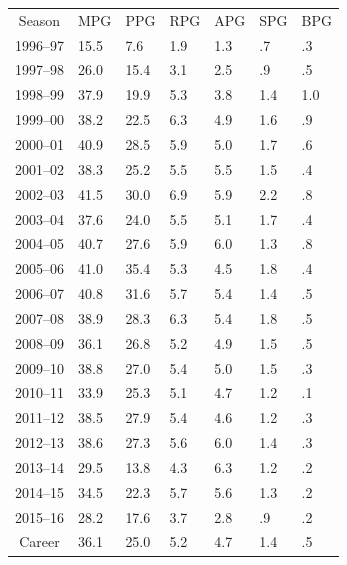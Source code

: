 	
	\begin{table}
		\centering
		\begin{tabularx}{0.9\textwidth}{| c | X | X | X | X | X | X |}
			
			Season  & MPG  & PPG  &	RPG & APG &	SPG & BPG \\
			1996–97 & 15.5 & 7.6  & 1.9 & 1.3 &  .7	&  .3 \\
			1997–98	& 26.0 & 15.4 &	3.1	& 2.5 &	 .9	&  .5 \\
			1998–99	& 37.9 & 19.9 &	5.3 & 3.8 &	1.4	& 1.0 \\
			1999–00	& 38.2 & 22.5 &	6.3	& 4.9 &	1.6	&  .9 \\
			2000–01 & 40.9 & 28.5 &	5.9	& 5.0 &	1.7 &  .6 \\
			2001–02 & 38.3 & 25.2 &	5.5	& 5.5 &	1.5	&  .4 \\
			2002–03 & 41.5 & 30.0 &	6.9	& 5.9 &	2.2	&  .8 \\
			2003–04	& 37.6 & 24.0 &	5.5	& 5.1 &	1.7	&  .4 \\
			2004–05	& 40.7 & 27.6 &	5.9	& 6.0 &	1.3 &  .8 \\
			2005–06	& 41.0 & 35.4 &	5.3	& 4.5 &	1.8 &  .4 \\
			2006–07	& 40.8 & 31.6 &	5.7	& 5.4 &	1.4	&  .5 \\
			2007–08	& 38.9 & 28.3 &	6.3	& 5.4 &	1.8	&  .5 \\
			2008–09	& 36.1 & 26.8 &	5.2	& 4.9 &	1.5	&  .5 \\
			2009–10	& 38.8 & 27.0 &	5.4	& 5.0 &	1.5	&  .3 \\
			2010–11	& 33.9 & 25.3 &	5.1	& 4.7 &	1.2	&  .1 \\
			2011–12	& 38.5 & 27.9 &	5.4	& 4.6 &	1.2	&  .3 \\
			2012–13	& 38.6 & 27.3 &	5.6	& 6.0 &	1.4	&  .3 \\
			2013–14	& 29.5 & 13.8 &	4.3	& 6.3 &	1.2	&  .2 \\
			2014–15	& 34.5 & 22.3 &	5.7	& 5.6 &	1.3	&  .2 \\
			2015–16	& 28.2 & 17.6 &	3.7	& 2.8 &	.9	&  .2 \\
			Career	& 36.1 & 25.0 &	5.2	& 4.7 &	1.4	&  .5 \\
		\end{tabularx}
	\end{table}